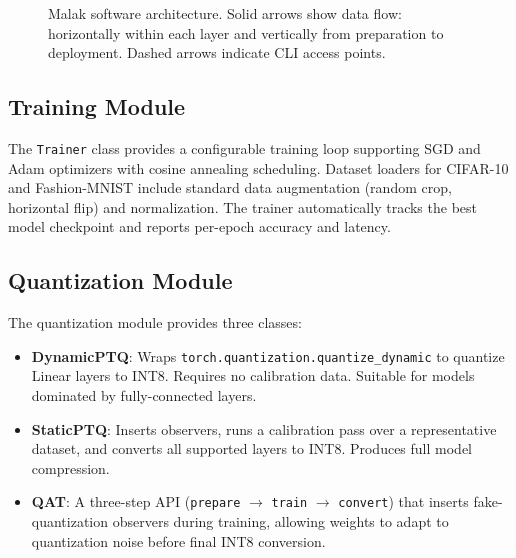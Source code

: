 \documentclass[10pt,twocolumn]{article}
\begin{document}
\begin{figure}[t]
\caption{Malak software architecture. Solid arrows show data flow: horizontally within each layer and vertically from preparation to deployment. Dashed arrows indicate CLI access points.}
\label{fig:architecture}
\end{figure}

\subsection{Training Module}

The \texttt{Trainer} class provides a configurable training loop supporting SGD and Adam optimizers with cosine annealing scheduling.
Dataset loaders for CIFAR-10 and Fashion-MNIST include standard data augmentation (random crop, horizontal flip) and normalization.
The trainer automatically tracks the best model checkpoint and reports per-epoch accuracy and latency.

\subsection{Quantization Module}

The quantization module provides three classes:

\begin{itemize}
    \item \textbf{DynamicPTQ}: Wraps \texttt{torch.quantization.quantize\_dynamic} to quantize Linear layers to INT8. Requires no calibration data. Suitable for models dominated by fully-connected layers.
    \item \textbf{StaticPTQ}: Inserts observers, runs a calibration pass over a representative dataset, and converts all supported layers to INT8. Produces full model compression.
    \item \textbf{QAT}: A three-step API (\texttt{prepare} $\to$ \texttt{train} $\to$ \texttt{convert}) that inserts fake-quantization observers during training, allowing weights to adapt to quantization noise before final INT8 conversion.
\end{itemize}
\end{document}
